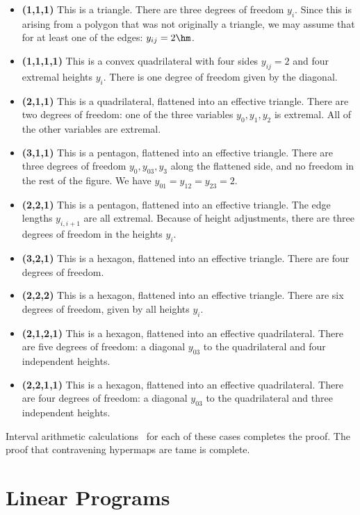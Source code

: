 \begin{itemize}
\item {\bf (1,1,1)}  This is a triangle.  There are three degrees of
freedom $y_i$.  Since this is arising from a polygon that was not originally a triangle, we may assume that for at least one of the edges: $y_{ij}=2\hm$.
\item {\bf (1,1,1,1)}  This is a convex quadrilateral with four sides $y_{ij}=2$ and four extremal heights $y_i$.  There is one degree of freedom given by the diagonal.
\item {\bf (2,1,1)} This is a quadrilateral, flattened into an effective triangle.  There are two degrees of freedom: one of the three variables $y_0,y_1,y_2$ is extremal.  All of the other variables are extremal.
\item {\bf (3,1,1)}  This is a pentagon, flattened into an effective triangle.  There are three degrees of freedom $y_0,y_{03},y_3$ along the flattened side, and no freedom in the rest of the figure.  We have $y_{01}=y_{12}=y_{23}=2$.
\item {\bf (2,2,1)} This is a pentagon, flattened into an effective triangle.  The edge lengths $y_{i,i+1}$ are all extremal.  Because of height adjustments, there are three degrees of freedom in the heights $y_i$.
\item {\bf (3,2,1)} This is a hexagon, flattened into an effective triangle.  There are four degrees of freedom.
\item {\bf (2,2,2)}  This is a hexagon, flattened into an effective triangle.  There are six degrees of freedom, given by all heights $y_i$.
\item {\bf (2,1,2,1)} This is a hexagon, flattened into an effective quadrilateral.  There are five degrees of freedom: a diagonal $y_{03}$ to the quadrilateral and four independent heights.
\item {\bf (2,2,1,1)}  This is a hexagon, flattened into an effective quadrilateral.  There are four degrees of freedom: a diagonal $y_{03}$ to the quadrilateral and three independent heights.
\end{itemize}


Interval arithmetic calculations~\cite[cc:tau]{hales:2009:nonlinear} %
for each of these cases completes the proof. The proof that contravening hypermaps are tame is complete.

\section{Linear Programs}

